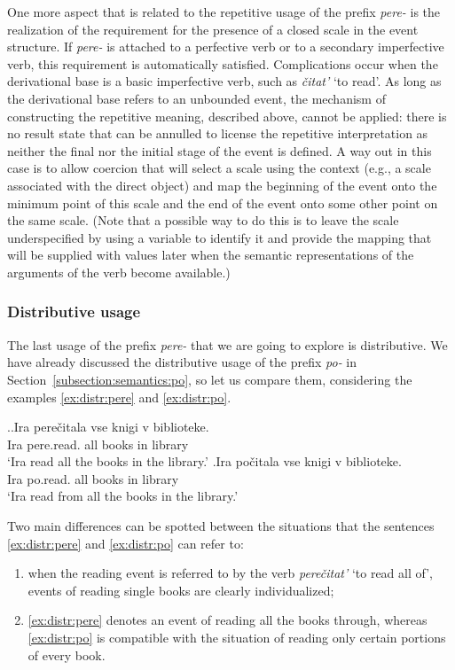 One more aspect that is related to the repetitive usage of the prefix \textit{pere-} is the realization of the requirement for the presence of a closed scale in the event structure. If \textit{pere-} is attached to a perfective verb or to a secondary imperfective verb, this requirement is automatically satisfied. Complications occur when the derivational base is a basic imperfective verb, such as \textit{\v{c}itat'} `to read'. As long as the derivational base refers to an unbounded event, the mechanism of constructing the repetitive meaning, described above, cannot be applied: there is no result state that can be annulled to license the repetitive interpretation as neither the final nor the initial stage of the event is defined. A way out in this case is to allow coercion that will select a scale using the context (e.g., a scale associated with the direct object) and map the beginning of the event onto the minimum point of this scale and the end of the event onto some other point on the same scale. (Note that a possible way to do this is to leave the scale underspecified by using a variable to identify it and provide the mapping that will be supplied with values later when the semantic representations of the arguments of the verb become available.)

\subsubsection{Distributive usage}
The last usage of the prefix \textit{pere-} that we are going to explore is distributive. We have already discussed the distributive usage of the prefix \textit{po-} in Section~\ref{subsection:semantics:po}, so let us compare them, considering the examples \ref{ex:distr:pere} and \ref{ex:distr:po}.

\ex.\ag.\label{ex:distr:pere}Ira pere\v{c}itala vse knigi v biblioteke.\\
Ira pere.read. all books in library\\
\trans `Ira read all the books in the library.'
\bg.\label{ex:distr:po}Ira po\v{c}itala vse knigi v biblioteke.\\
Ira po.read. all books in library\\
\trans `Ira read from all the books in the library.'

Two main differences can be spotted between the situations that the sentences \ref{ex:distr:pere} and \ref{ex:distr:po} can refer to:
\begin{enumerate}
\item when the reading event is referred to by the verb \textit{pere\v{c}itat'} `to read all of', events of reading single books are clearly individualized;
\item \ref{ex:distr:pere} denotes an event of reading all the books through, whereas \ref{ex:distr:po} is compatible with the situation of reading only certain portions of every book.
\end{enumerate}

